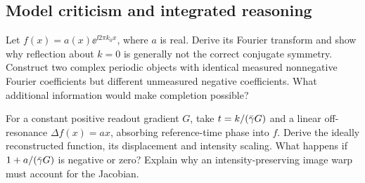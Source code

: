 \subsection{Model criticism and integrated reasoning}
\begin{challengeproblem}\label{prob:06:partial}
Let \(f(x)=a(x)\ee^{\ii2\pi k_0x}\), where \(a\) is real.
Derive its Fourier transform and show why reflection about \(k=0\) is generally not the correct conjugate symmetry.
Construct two complex periodic objects with identical measured nonnegative Fourier coefficients but different unmeasured negative coefficients. What additional information would make completion possible?
\end{challengeproblem}
\begin{challengeproblem}\label{prob:06:distort}
For a constant positive readout gradient \(G\), take \(t=k/(\bar{\gamma} G)\) and a linear off-resonance \(\Delta f(x)=ax\), absorbing reference-time phase into \(f\).
Derive the ideally reconstructed function, its displacement and intensity scaling.
What happens if \(1+a/(\bar{\gamma} G)\) is negative or zero? Explain why an intensity-preserving image warp must account for the Jacobian.
\end{challengeproblem}
